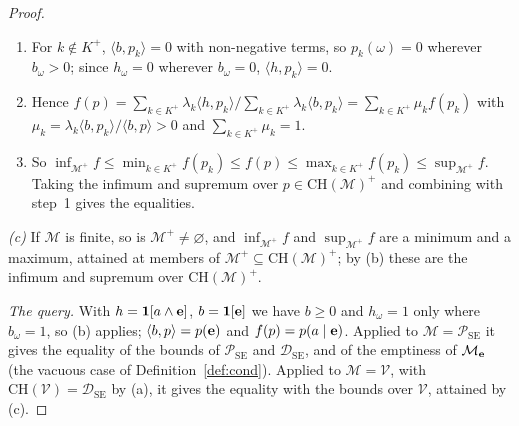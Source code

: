 \documentclass{article} %
\newcommand{\DSE}{\mathcal{D}_{\mathrm{SE}}}
\begin{document}
\begin{proof}
\begin{enumerate}
  $\ge0$ (as $b\ge0$, $p_k\ge0$); since $\langle b,p\rangle>0$, the index set
  $K^+=\{k:\langle b,p_k\rangle>0\}$ is non-empty, and $p_k\in\mathcal M^+$ for
  $k\in K^+$. This proves the converse of step~1's last claim.
  \item For $k\notin K^+$, $\langle b,p_k\rangle=0$ with non-negative terms, so
  $p_k(\omega)=0$ wherever $b_\omega>0$; since $h_\omega=0$ wherever
  $b_\omega=0$, $\langle h,p_k\rangle=0$.
  \item Hence $f(p)=\sum_{k\in K^+}\lambda_k\langle h,p_k\rangle\big/\sum_{k\in K^+}\lambda_k\langle b,p_k\rangle=\sum_{k\in K^+}\mu_kf(p_k)$
  with $\mu_k=\lambda_k\langle b,p_k\rangle/\langle b,p\rangle>0$ and
  $\sum_{k\in K^+}\mu_k=1$.
  \item So $\inf_{\mathcal M^+}f\le\min_{k\in K^+}f(p_k)\le f(p)\le\max_{k\in K^+}f(p_k)\le\sup_{\mathcal M^+}f$.
  Taking the infimum and supremum over $p\in\mathrm{CH}(\mathcal M)^+$ and
  combining with step~1 gives the equalities.
\end{enumerate}
\emph{(c)} If $\mathcal M$ is finite, so is $\mathcal M^+\neq\varnothing$, and
$\inf_{\mathcal M^+}f$ and $\sup_{\mathcal M^+}f$ are a minimum and a maximum,
attained at members of $\mathcal M^+\subseteq\mathrm{CH}(\mathcal M)^+$; by (b)
these are the infimum and supremum over $\mathrm{CH}(\mathcal M)^+$.

\emph{The query.} With $h=\mathbf 1[a\wedge\mathbf{e}]$, $b=\mathbf 1[\mathbf{e}]$ we have
$b\ge0$ and $h_\omega=1$ only where $b_\omega=1$, so (b) applies;
$\langle b,p\rangle=p(\mathbf{e})$ and $f(p)=p(a\mid\mathbf{e})$. Applied to
$\mathcal M=\mathcal P_{\mathrm{SE}}$ it gives the equality of the bounds of
$\mathcal P_{\mathrm{SE}}$ and $\DSE$, and of the emptiness of
$\mathcal M_{\mathbf{e}}$ (the vacuous case of Definition~\ref{def:cond}). Applied to
$\mathcal M=\mathcal V$, with $\mathrm{CH}(\mathcal V)=\DSE$ by (a), it gives the
equality with the bounds over $\mathcal V$, attained by (c).
\end{proof}
\end{document}
